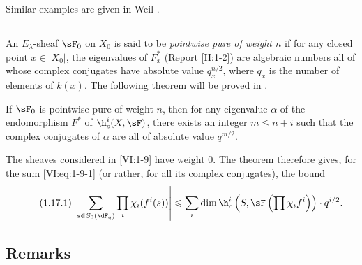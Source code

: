 Similar examples are given in Weil . 





\subsection{}\label{VI:1-16}

An $E_\lambda$-sheaf $\sF_0$ on $X_0$ is said to be \emph{pointwise pure of 
weight $n$} if for any closed point $x\in |X_0|$, the eigenvalues of 
$F_x^\ast$ (\hyperref[II]{Report} \ref{II:1-2}) are algebraic numbers 
all of whose complex conjugates have absolute value 
$q_x^{n/2}$, where $q_x$ is the number of elements of $k(x)$. The 
following theorem will be proved in . 





\begin{theorem_}\label{VI:1-17}
If $\sF_0$ is pointwise pure of weight $n$, then for any eigenvalue $\alpha$ 
of the endomorphism $F^\ast$ of $\h_c^i(X,\sF)$, there exists an integer 
$m\leqslant n+i$ such that the complex conjugates of $\alpha$ are all of 
absolute value $q^{m/2}$.
\end{theorem_}

The sheaves considered in \ref{VI:1-9} have weight $0$. The theorem 
therefore gives, for the sum \ref{VI:eq:1-9-1} (or rather, for all its 
complex conjugates), the bound 
\begin{equation*}\tag{1.17.1}\label{VI:eq:1-17-1}
  \left|\sum_{s\in S_0(\dF_q)} \prod_i \chi_i(f^i(s)) \right| \leqslant \sum_i \dim \h_c^i\left(S,\sF\left(\prod \chi_i f^i\right)\right)\cdot q^{i/2} \text{.}
\end{equation*}





\subsection{Remarks}\label{VI:1-18}

